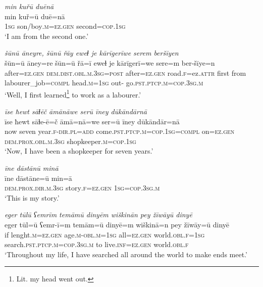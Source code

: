\ea \label{ŽM.3}
\textit{min kuřū duēnā} \\ 
\gll min kuř=ū duē=nā \\ 
 \textsc{1sg} son/boy\textsc{.m}\textsc{=ez.gen} second\textsc{=cop}\textsc{.\textsc{1sg}} \\ 
\glt `I am from the second one.'
\z 
 
\ea \label{ŽM.4}
\textit{šūnū āneyre, šūnū řāy eweɫ je kārīgerīwe serem beršīyen} \\ 
\gll šūn=ū āney=re šūn=ū řā=ī eweɫ je kārīgerī=we sere=m ber-šīye=n \\ 
 after\textsc{=ez.gen} \textsc{dem.dist}\textsc{.obl}\textsc{.m}\textsc{.3sg}\textsc{=\textsc{post}} after\textsc{=ez.gen} road\textsc{.f}=ez.\textsc{attr} first from labourer\_job\textsc{=compl} head\textsc{.m}\textsc{=\textsc{1sg}} out- go\textsc{.pst}\textsc{.ptcp}\textsc{.m}\textsc{=cop}\textsc{.3sg}\textsc{.m} \\ 
\glt `Well, I first learned\footnote{Lit. my head went out.}  to work as a labourer.'
\z 
 
\ea \label{ŽM.8}
\textit{īse ħewt sāɫēč āmānāwe serū īney dūkāndārnā} \\ 
\gll īse ħewt sāɫe-ē=č āmā=nā=we ser=ū īney dūkāndār=nā \\ 
 now seven year\textsc{.f}\textsc{-dir}\textsc{.pl}\textsc{=add} come\textsc{.pst}\textsc{.ptcp}\textsc{.m}\textsc{=cop}\textsc{.\textsc{1sg}}\textsc{=compl} on\textsc{=ez.gen} \textsc{dem.prox}\textsc{.obl}\textsc{.m}\textsc{.3sg} shopkeeper\textsc{.m}\textsc{=cop}\textsc{.\textsc{1sg}} \\ 
\glt `Now, I have been a shopkeeper for seven years.'
\z 
 
\ea \label{ŽM.12}
\textit{īne dāstānū minā} \\ 
\gll īne dāstāne=ū min=ā \\ 
 \textsc{dem.prox}\textsc{.dir}\textsc{.m}\textsc{.3sg} story\textsc{.f}\textsc{=ez.gen} \textsc{1sg}\textsc{=cop}\textsc{.3sg}\textsc{.m} \\ 
\glt `This is my story.'
\z 
 
\ea \label{ŽM.13}
\textit{eger tūlū ʕemrīm temāmū dinyēm wiškinān pey žīwāyū dinyē} \\ 
\gll eger tūl=ū ʕemr-ī=m temām=ū dinyē=m wiškinā=n pey žīwāy=ū dinyē \\ 
 if lenght\textsc{.m}\textsc{=ez.gen} age\textsc{.m}\textsc{-obl}\textsc{.m}\textsc{=\textsc{1sg}} all\textsc{=ez.gen} world\textsc{.obl}\textsc{.f}\textsc{=\textsc{1sg}} search\textsc{.pst}\textsc{.ptcp}\textsc{.m}\textsc{=cop}\textsc{.3sg}\textsc{.m} to live\textsc{.inf}\textsc{=ez.gen} world\textsc{.obl}\textsc{.f} \\ 
\glt `Throughout my life, I have searched all around the world to make ends meet.'
\z 
 

